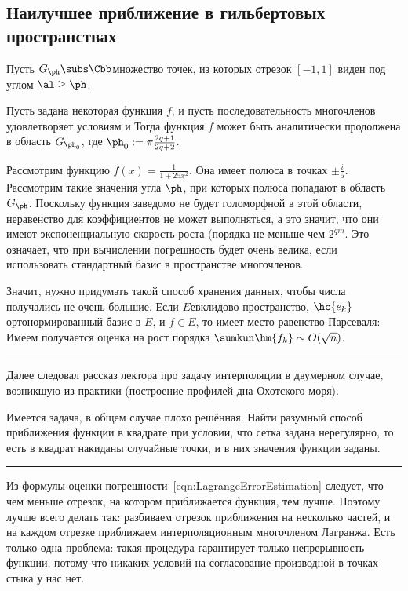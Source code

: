 \documentclass[a4paper]{article}
\newenvironment{petit}{\medskip\hrule\smallskip\footnotesize}{\par\smallskip\hrule\medskip}
\begin{document}
\subsection{Наилучшее приближение в гильбертовых пространствах}

Пусть $G_\ph \subs \Cbb$\т множество точек, из которых отрезок $[-1,1]$ виден под углом $\al \ge \ph$.

\begin{theorem}
Пусть задана некоторая функция $f$, и пусть последовательность многочленов
удовлетворяет условиям
и
Тогда функция $f$ может быть аналитически продолжена в область $G_{\ph_0}$,
где $\ph_0 := \pi\frac{2q + 1}{2q+2}$.
\end{theorem}

Рассмотрим функцию $f(x) = \frac{1}{1 + 25x^2}$. Она имеет полюса в точках $\pm\frac{i}{5}$.
Рассмотрим такие значения угла $\ph$, при которых полюса попадают в область $G_\ph$. Поскольку
функция заведомо не будет голоморфной в этой области, неравенство для коэффициентов не может выполняться,
а это значит, что они имеют экспоненциальную скорость роста (порядка не меньше чем $2^{qm}$.
Это означает, что при вычислении погрешность будет очень велика, если использовать стандартный базис
в пространстве многочленов.

Значит, нужно придумать такой способ хранения данных, чтобы числа получались не очень большие.
Если $E$\т евклидово пространство, $\hc{e_k}$\т ортонормированный базис в $E$, и $f \in E$,
то имеет место равенство Парсеваля:
Имеем
 получается оценка на рост порядка $\sumkun \hm{f_k} \sim  O(\sqrt{n})$.

\begin{petit}
Далее следовал рассказ лектора про задачу интерполяции в двумерном случае,
возникшую из практики (построение профилей дна Охотского моря).

Имеется задача, в общем случае плохо решённая. Найти разумный способ приближения
функции в квадрате при условии, что сетка задана нерегулярно, то есть в квадрат
накиданы случайные точки, и в них значения функции заданы.
\end{petit}


Из формулы оценки погрешности~\eqref{eqn:LagrangeErrorEstimation} следует, что чем меньше отрезок, на котором приближается
функция, тем лучше. Поэтому лучше всего делать так: разбиваем отрезок приближения
на несколько частей, и на каждом отрезке приближаем интерполяционным многочленом Лагранжа.
Есть только одна проблема: такая процедура гарантирует только непрерывность функции,
потому что никаких условий на согласование производной в точках стыка у нас нет.
\end{document}
